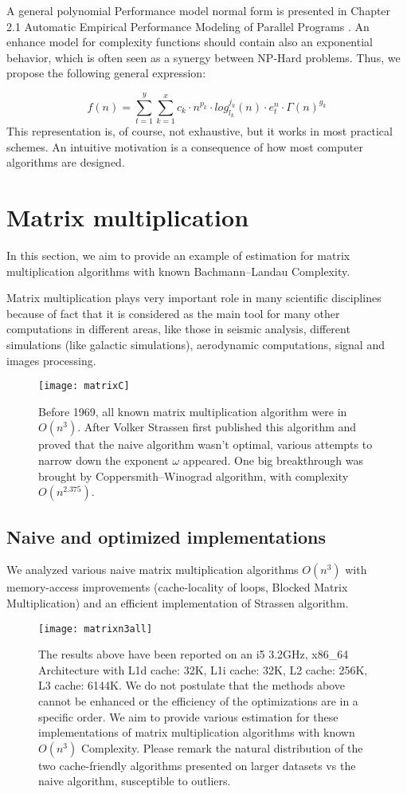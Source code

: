 A general polynomial Performance model normal form is presented in Chapter 2.1 Automatic Empirical Performance Modeling of Parallel Programs \cite{calotoiu2018automatic}. An enhance model for complexity functions should contain also an exponential behavior, which is often seen as a synergy between NP-Hard problems. Thus, we propose the following general expression:

\[ f(n) =\sum\limits_{t=1}^{y}  \sum\limits_{k=1}^{x} c_{k} \cdot n^{p_{k}} \cdot log_{l_{k}}^{j_{k}}(n) \cdot e_{t}^{n} \cdot  \Gamma(n)^{g_{k}} \]
This representation is, of course, not exhaustive, but it works in most practical schemes. An intuitive motivation is a consequence of how most computer algorithms are designed. \cite{calotoiu2018automatic}


\section{Matrix multiplication}
In this section, we aim to provide an example of estimation for matrix multiplication algorithms with known Bachmann–Landau Complexity.

Matrix multiplication plays very important role in many scientific disciplines because of fact that it is considered as the main tool for many other computations in different areas, like those in seismic analysis, different simulations (like galactic simulations), aerodynamic computations, signal and images processing. \cite{4588528}


\begin{figure}[H]
    \centering
    \texttt{[image: matrixC]}
    \caption{Before 1969, all known matrix multiplication algorithm were in $O(n^3)$. After Volker Strassen first published this algorithm and proved that the naive algorithm wasn't optimal, various attempts to narrow down the exponent $\omega$ appeared. One big breakthrough was brought by Coppersmith–Winograd algorithm, with complexity $O(n^{2.375})$. }
\end{figure}

\subsection{Naive and optimized implementations}
We analyzed various naive matrix multiplication algorithms $O(n^3)$ with memory-access improvements (cache-locality of loops, Blocked Matrix Multiplication) and an efficient implementation of Strassen algorithm.

\begin{figure}[H]
    \centering
    \texttt{[image: matrixn3all]}
    \caption{The results above have been reported on an i5 3.2GHz, x86\_64 Architecture with L1d cache: 32K, L1i cache: 32K, L2 cache: 256K, L3 cache: 6144K. We do not postulate that the methods above cannot be enhanced
    or the efficiency of the optimizations are in a specific order. We aim to provide various estimation for these implementations of matrix multiplication algorithms with known $O(n^3)$ Complexity. Please remark the natural distribution of the two cache-friendly algorithms presented on larger datasets vs the naive algorithm, susceptible to outliers.}
\end{figure}


